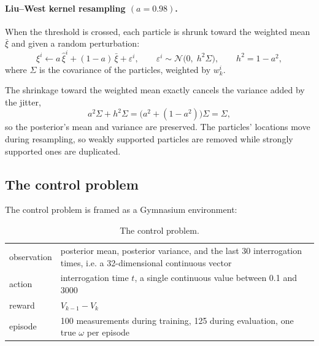 \documentclass[12pt,a4paper]{article}
\begin{document}
\paragraph{Liu--West kernel resampling $(a = 0.98)$.}
When the threshold is crossed, each particle is shrunk toward the weighted mean
$\bar{\xi}$ and given a random perturbation:
\begin{equation}
\xi^i \leftarrow a\,\hat{\xi}^i + (1-a)\,\bar{\xi} + \varepsilon^i,
\qquad \varepsilon^i \sim \mathcal{N}\!\bigl(0,\; h^{2}\Sigma\bigr),
\qquad h^{2} = 1 - a^{2},
\label{eq:liu-west}
\end{equation}
where $\Sigma$ is the covariance of the particles, weighted by $w_k^i$.

The shrinkage toward the weighted mean exactly cancels the variance added by the
jitter,
\begin{equation}
a^{2}\Sigma + h^{2}\Sigma
  = \bigl(a^{2} + (1-a^{2})\bigr)\Sigma = \Sigma,
\end{equation}
so the posterior's mean and variance are preserved. The particles' locations move during
resampling, so weakly supported particles are removed while strongly supported ones are duplicated.
\subsection{The control problem}
\label{sec:the-control-problem}
The control problem is framed as a Gymnasium environment:

\begin{table}[H]
  \centering
  \caption{The control problem.}
  \label{tab:the-control-problem}
  \scriptsize
  \begin{tabular}{ll}
  \toprule
  observation & posterior mean, posterior variance, and the last 30 interrogation
  times, i.e. a 32-dimensional continuous vector \\
  action & interrogation time $t$, a single continuous value between 0.1 and 3000 \\
  reward & $V_{k-1} - V_k$ \\
  episode & 100 measurements during training, 125 during evaluation, one true
  $\omega$ per episode \\
  \bottomrule
  \end{tabular}
\end{table}

\end{document}

